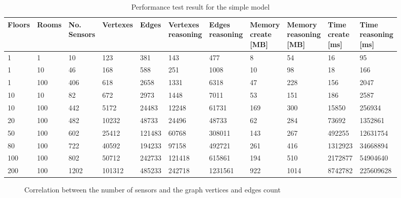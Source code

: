 \begin{table}
\centering
\caption{Performance test result for the simple model}
\label{tab:perf_simple}
\begin{adjustbox}{max width=\textwidth}
\begin{tabular}{lll|llll|llll}
\textbf{Floors} & \textbf{Rooms} & \specialcell{\textbf{No.}\\\textbf{Sensors}} & \textbf{Vertexes} & \textbf{Edges} & \specialcell{\textbf{Vertexes}\\\textbf{reasoning}} & \specialcell{\textbf{Edges}\\\textbf{reasoning}} & \specialcell{\textbf{Memory}\\\textbf{create}\\\textbf{{[}MB{]}}} & \specialcell{\textbf{Memory}\\\textbf{reasoning}\\\textbf{{[}MB{]}}} & \specialcell{\textbf{Time}\\\textbf{create}\\\textbf{{[}ms{]}}} & \specialcell{\textbf{Time}\\\textbf{reasoning}\\\textbf{{[}ms{]}}} \\\hline
1 & 1 & 10 & 123 & 381 & 143 & 477 & 8 & 54 & 16 & 95 \\
1 & 10 & 46 & 168 & 588 & 251 & 1008 & 10 & 98 & 18 & 166 \\
1 & 100 & 406 & 618 & 2658 & 1331 & 6318 & 47 & 228 & 156 & 2047 \\
10 & 10 & 82 & 672 & 2973 & 1448 & 7011 & 53 & 151 & 186 & 2587 \\
10 & 100 & 442 & 5172 & 24483 & 12248 & 61731 & 169 & 300 & 15850 & 256934 \\
20 & 100 & 482 & 10232 & 48733 & 24496 & 48733 & 62 & 284 & 73692 & 1352861 \\
50 & 100 & 602 & 25412 & 121483 & 60768 & 308011 & 143 & 267 & 492255 & 12631754 \\
80 & 100 & 722 & 40592 & 194233 & 97158 & 492721 & 261 & 416 & 1312923 & 34668894 \\
100 & 100 & 802 & 50712 & 242733 & 121418 & 615861 & 194 & 510 & 2172877 & 54904640 \\
200 & 100 & 1202 & 101312 & 485233 & 242718 & 1231561 & 922 & 1014 & 8742782 & 225609628
\end{tabular}
\end{adjustbox}
\end{table}
\begin{figure}
  \centering
  \caption{Correlation between the number of sensors and the graph vertices and edges count}
  \label{fig:sensor_vertexes_chart}
\end{figure}
